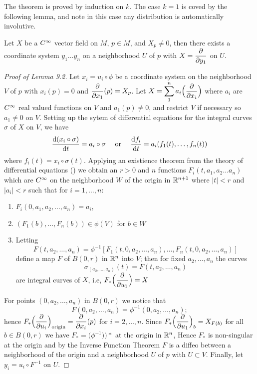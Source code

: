 \documentclass[../main]{subfiles}
\begin{document}
The theorem is proved by induction on $k$. The case $k=1$ is coved by the following lemma, and note in this case any distribution is automatically involutive.

\begin{lemma}\label{lem:ch09.1.2}
Let $X$ be a $C^\infty$ vector field on $M$, $p\in M$, and $X_p\neq 0$, then there exists a coordinate system $y_1\dots y_n$ on a neighborhood $U$ of $p$ with $X=\dfrac{\partial }{\partial y_1}$ on $U$.
\end{lemma}
\begin{proof}[Proof of Lemma 9.2]
Let $x_i=u_i\circ \phi$ be a coordinate system on the neighborhood $V$ of $p$ with $x_i(p)=0$ and $\dfrac{\partial }{\partial x_1}(p)=X_p$. Let $X=\displaystyle \sum_1^n a_i \Big(\dfrac{\partial }{\partial x_i}\Big)$ where $a_i$ are $C^\infty$ real valued functions on $V$ and $a_1(p)\neq 0$, and restrict $V$ if necessary so $a_1\neq 0$ on $V$. Setting up the sytem of differential equations for the integral curves $\sigma$ of $X$ on $V$, we have 
\[\dfrac{\mathrm{d}(x_i\circ \sigma)}{\mathrm{d}t} = a_i \circ \sigma \quad \text{ or } \quad \dfrac{\mathrm{d}f_i}{\mathrm{d}t}= a_i(f_1(t),\dots,f_n(t)) \]
where $f_i (t)=x_i \circ \sigma(t)$. Applying an existience theorem from the theory of differential equations (\cite[Chapter 1]{coddington1990theory}) we obtain an $r>0$ and $n$ functions $F_i(t,a_1,a_2\dots a_n)$ which are $C^\infty$ on the neighborhood $W$ of the origin in $\mathbb{R}^{n+1}$ where $|t|<r$ and $|a_i|<r$ such that for $i=1,\dots,n$:
\begin{enumerate}[label = (\arabic*)]
    \item $F_i(0,a_1,a_2,\dots,a_n)=a_i$,
    \item $(F_1(b),\dots,F_n(b))\in \phi(V)$ for $b\in W$
    \item Letting \[F(t,a_2,\dots, a_n)=\phi^{-1}[F_1(t,0,a_2,\dots,a_n),\dots, F_n(t,0,a_2,\dots ,a_n)]\]
    define a map $F$ of $B(0,r)$ in $\mathbb{R}^n$ into $V$; then for fixed $a_2,\dots,a_n$ the curves \[\sigma_{(a_2,\dots,a_n)}(t)=F(t,a_2,\dots,a_n)\]
    are integral curves of $X$, i.e, $F_\ast\Big(\dfrac{\partial }{\partial u_1}\Big)=X$
\end{enumerate}

For points $(0,a_2,\dots,a_n)$ in $B(0,r)$ we notice that \[F(0,a_2,\dots,a_n)=\phi^{-1}(0,a_2,\dots,a_n);\] hence $F_\ast\Big(\dfrac{\partial }{\partial u_i}\Big)_{\text{origin}} = \dfrac{\partial }{\partial x_i}(p)$ for $i=2,\dots,n$. Since $F_\ast \Big(\dfrac{\partial }{\partial u_1}\Big)_b= X_{F(b)}$ for all $b\in B(0,r)$ we have $F_\ast = \big(\phi^{-1}\big))\ast$ at the origin in $\mathbb{R}^n$, Hence $F_\ast$ is non-singular at the origin and by the Inverse Function Theorem $F$ is a diffeo between a neighborhood of the origin and a neighborhood $U$ of $p$ with $U\subset V$. Finally, let $y_i=u_i\circ F^{-1}$ on $U$.
\end{proof}
\end{document}
